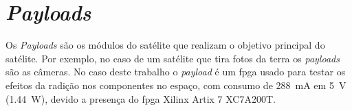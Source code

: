 \section{\textit{Payloads}}

Os \textit{Payloads} são os módulos do satélite que realizam o objetivo principal do satélite. Por exemplo, no caso de um satélite que tira fotos da terra os \textit{payloads} são as câmeras. No caso deste trabalho o \textit{payload} é um \gls{fpga} usado para testar os efeitos da radição nos componentes no espaço, com consumo de \SI{288}{\milli\ampere} em \SI{5}{\volt} (\SI{1,44}{\watt}), devido a presença do \gls{fpga} Xilinx Artix 7 XC7A200T.